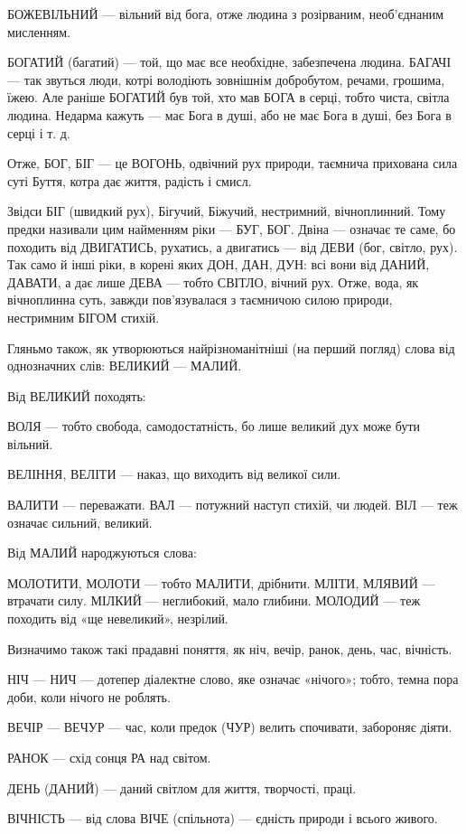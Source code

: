 БОЖЕВІЛЬНИЙ — вільний від бога, отже людина з розірваним, необ’єднаним
мисленням.

БОГАТИЙ (багатий) — той, що має все необхідне, забезпечена людина. БАГАЧІ — так
звуться люди, котрі володіють зовнішнім добробутом, речами, грошима, їжею. Але
раніше БОГАТИЙ був той, хто мав БОГА в серці, тобто чиста, світла людина.
Недарма кажуть — має Бога в душі, або не має Бога в душі, без Бога в серці і т.
д.

Отже, БОГ, БІГ — це ВОГОНЬ, одвічний рух природи, таємнича прихована сила суті
Буття, котра дає життя, радість і смисл.

Звідси БІГ (швидкий рух), Бігучий, Біжучий, нестримний, вічноплинний. Тому
предки називали цим найменням ріки — БУГ, БОГ. Двіна — означає те саме, бо
походить від ДВИГАТИСЬ, рухатись, а двигатись — від ДЕВИ (бог, світло, рух).
Так само й інші ріки, в корені яких ДОН, ДАН, ДУН: всі вони від ДАНИЙ, ДАВАТИ,
а дає лише ДЕВА — тобто СВІТЛО, вічний рух. Отже, вода, як вічноплинна суть,
завжди пов’язувалася з таємничою силою природи, нестримним БІГОМ стихій.

Гляньмо також, як утворюються найрізноманітніші (на перший погляд) слова від
однозначних слів: ВЕЛИКИЙ — МАЛИЙ.

Від ВЕЛИКИЙ походять:

ВОЛЯ — тобто свобода, самодостатність, бо лише великий дух може бути вільний.

ВЕЛІННЯ, ВЕЛІТИ — наказ, що виходить від великої сили.

ВАЛИТИ — переважати. ВАЛ — потужний наступ стихій, чи людей. ВІЛ — теж означає
сильний, великий.

Від МАЛИЙ народжуються слова:

МОЛОТИТИ, МОЛОТИ — тобто МАЛИТИ, дрібнити. МЛІТИ, МЛЯВИЙ — втрачати силу.
МІЛКИЙ — неглибокий, мало глибини. МОЛОДИЙ — теж походить від «ще невеликий»,
незрілий.

Визначимо також такі прадавні поняття, як ніч, вечір, ранок, день, час,
вічність.

НІЧ — НИЧ — дотепер діалектне слово, яке означає «нічого»; тобто, темна пора
доби, коли нічого не роблять.

ВЕЧІР — ВЕЧУР — час, коли предок (ЧУР) велить спочивати, забороняє діяти.

РАНОК — схід сонця РА над світом.

ДЕНЬ (ДАНИЙ) — даний світлом для життя, творчості, праці.

ВІЧНІСТЬ — від слова ВІЧЕ (спільнота) — єдність природи і всього живого.

